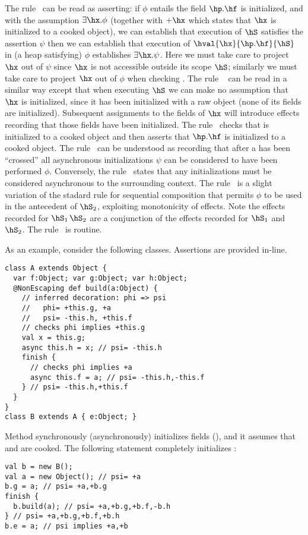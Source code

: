 The rule~ can be read as asserting: if $\phi$ entails
the field $\hp.\hf$ is initialized, and with the assumption $\exists \hx.\phi$
(together with $+\hx$ which states that $\hx$ is initialized to a
cooked object), we can establish that execution of $\hS$ satisfies the assertion
$\psi$ then we can establish that execution of
$\hval{\hx}{\hp.\hf}{\hS}$ in
(a heap satisfying) $\phi$ establishes $\exists \hx.\psi$. Here we
must take care to project $\hx$ out of $\psi$ since $\hx$ is not
accessible outside its scope $\hS$; similarly we must take care to
project $\hx$ out of $\phi$ when checking \hS.
The rule ~ can be read in a similar way except that when
executing $\hS$ we can make no assumption that $\hx$ is initialized,
since it has been initialized with a raw object (none of its fields
are initialized). Subsequent assignments to the fields of $\hx$ will
introduce effects recording that those fields have been initialized.
The rule~ checks that \hq{} is initialized to a
cooked object and then asserts that $\hp.\hf$ is initialized to a
cooked object.
The rule~ can be understood as recording that after a
\finish{} has been ``crossed'' all asynchronous initializations $\psi$
can be considered to have been performed $\phi$. Conversely,
the rule~ states that any initializations must be
considered asynchronous to the surrounding context.
The rule~ is a slight variation of the stadard rule for
sequential composition that permits $\phi$ to be used in the
antecedent of $\hS_2$, exploiting monotonicity of effects. Note the
effects recorded for $\hS_1\,\hS_2$ are a conjunction of the effects
recorded for $\hS_1$ and $\hS_2$.
The rule~ is routine.

As an example, consider the following classes. Assertions are provided
in-line.
\vspace{-0.2cm}\begin{lstlisting}
class A extends Object {
  var f:Object; var g:Object; var h:Object;
  @NonEscaping def build(a:Object) {
    // inferred decoration: phi => psi
    //   phi= +this.g, +a
    //   psi= -this.h, +this.f
    // checks phi implies +this.g
    val x = this.g;
    async this.h = x; // psi= -this.h
    finish {
      // checks phi implies +a
      async this.f = a; // psi= -this.h,-this.f
    } // psi= -this.h,+this.f
  }
}
class B extends A { e:Object; }
\end{lstlisting}\vspace{-0.2cm}
Method  synchronously (asynchronously) initializes fields  (),
    and it assumes that  and  are cooked.
The following statement completely initializes :
\vspace{-0.2cm}\begin{lstlisting}
val b = new B();
val a = new Object(); // psi= +a
b.g = a; // psi= +a,+b.g
finish {
  b.build(a); // psi= +a,+b.g,+b.f,-b.h
} // psi= +a,+b.g,+b.f,+b.h
b.e = a; // psi implies +a,+b
\end{lstlisting}\vspace{-0.2cm}


